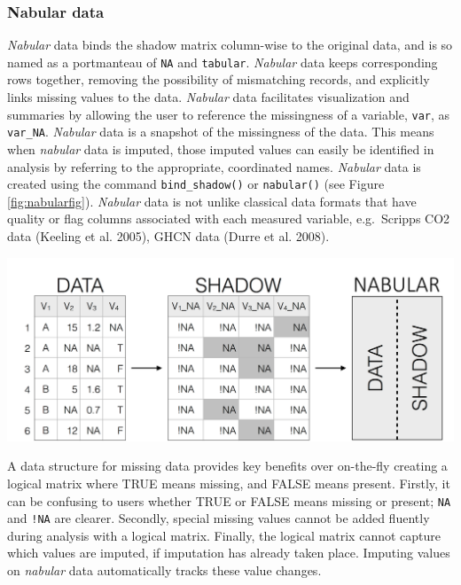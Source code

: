 \documentclass[]{article}
\let\origfigure\figure
\let\endorigfigure\endfigure
\renewenvironment{figure}[1][2] {
    \expandafter\origfigure\expandafter[H]
} {
    \endorigfigure
}
\theoremstyle{definition}
\theoremstyle{definition}
\theoremstyle{definition}
\theoremstyle{remark}
\begin{document}
\hypertarget{nabular-data}{%
\subsubsection{Nabular data}\label{nabular-data}}

\emph{Nabular} data binds the shadow matrix column-wise to the original
data, and is so named as a portmanteau of \texttt{NA} and
\texttt{tabular}. \emph{Nabular} data keeps corresponding rows together,
removing the possibility of mismatching records, and explicitly links
missing values to the data. \emph{Nabular} data facilitates
visualization and summaries by allowing the user to reference the
missingness of a variable, \texttt{var}, as \texttt{var\_NA}.
\emph{Nabular} data is a snapshot of the missingness of the data. This
means when \emph{nabular} data is imputed, those imputed values can
easily be identified in analysis by referring to the appropriate,
coordinated names. \emph{Nabular} data is created using the command
\texttt{bind\_shadow()} or \texttt{nabular()} (see Figure
\ref{fig:nabularfig}). \emph{Nabular} data is not unlike classical data
formats that have quality or flag columns associated with each measured
variable, e.g.~Scripps CO2 data (Keeling et al. 2005), GHCN data (Durre
et al. 2008).

\begin{figure}

{\centering \includegraphics[width=1\linewidth]{images/nabular} 

}

\caption{The process of creating nabular data. Data transformed to shadow matrix, and nabular data contains the shadow matrix, column bound to the data. Nabular data can be created using `bind\_shadow` or `nabular()` functions. Nabular data provides a useful format for missing data exploration and analysis.}\label{fig:nabularfig}
\end{figure}

A data structure for missing data provides key benefits over on-the-fly
creating a logical matrix where TRUE means missing, and FALSE means
present. Firstly, it can be confusing to users whether TRUE or FALSE
means missing or present; \texttt{NA} and \texttt{!NA} are clearer.
Secondly, special missing values cannot be added fluently during
analysis with a logical matrix. Finally, the logical matrix cannot
capture which values are imputed, if imputation has already taken place.
Imputing values on \emph{nabular} data automatically tracks these value
changes.
\end{document}
